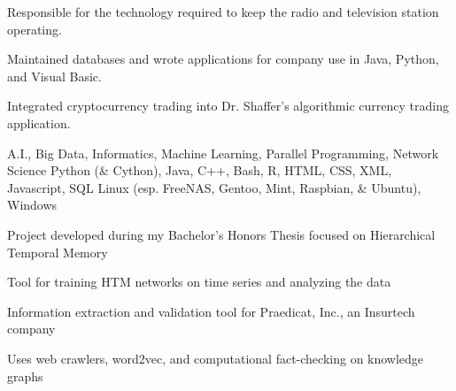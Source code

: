 \documentclass{acmresume}
\begin{document}
        \begin{titemize}
            \item{Responsible for the technology required to keep the radio and television station operating.}
        \end{titemize}
		
        \begin{titemize}
            \item{Maintained databases and wrote applications for company use in Java, Python, and Visual Basic.}
        \end{titemize}

        \begin{titemize}
            \item Integrated cryptocurrency trading into Dr. Shaffer's algorithmic currency trading application.
        \end{titemize}
		

        \begin{description}[topsep=1pt,itemsep=1pt]
             A.I., Big Data, Informatics, Machine Learning, Parallel Programming, Network Science
             Python (\& Cython), Java, C++, Bash, R, HTML, CSS, XML, Javascript, SQL
             Linux (esp. FreeNAS, Gentoo, Mint, Raspbian, \& Ubuntu), Windows
        \end{description}
		
	
		
		\begin{titemize}
			\item Project developed during my Bachelor's Honors Thesis focused on Hierarchical Temporal Memory
			\item Tool for training HTM networks on time series and analyzing the data
		\end{titemize}
	
	   \begin{titemize}
           \item Information extraction and validation tool for Praedicat, Inc., an Insurtech company
           \item Uses web crawlers, word2vec, and computational fact-checking on knowledge graphs
       \end{titemize}
   
\end{document}
